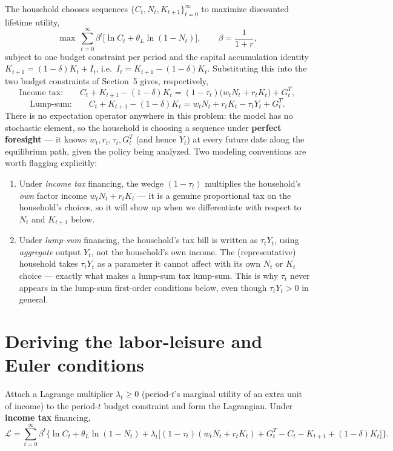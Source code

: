 \documentclass[11pt]{article}
\newcommand{\eq}[1]{\begin{equation}#1\end{equation}}
\begin{document}
The household chooses sequences $\{C_t,N_t,K_{t+1}\}_{t=0}^{\infty}$ to
maximize discounted lifetime utility,
\eq{ \max\ \sum_{t=0}^{\infty}\beta^t\Big[\ln C_t + \theta_L\ln(1-N_t)\Big], \qquad \beta=\frac{1}{1+r}, }
subject to one budget constraint per period and the capital accumulation
identity $K_{t+1}=(1-\delta)K_t+I_t$, i.e.\ $I_t=K_{t+1}-(1-\delta)K_t$.
Substituting this into the two budget constraints of
Section~5 gives, respectively,
\eq{ \text{Income tax:}\qquad C_t + K_{t+1}-(1-\delta)K_t = (1-\tau_t)\big(w_tN_t+r_tK_t\big)+G^T_t, \label{app:bc-it} }
\eq{ \text{Lump-sum:}\qquad C_t + K_{t+1}-(1-\delta)K_t = w_tN_t+r_tK_t-\tau_tY_t+G^T_t. \label{app:bc-ls} }
There is no expectation operator anywhere in this problem: the model has
no stochastic element, so the household is choosing a sequence under
\textbf{perfect foresight} --- it knows $w_t,r_t,\tau_t,G^T_t$ (and hence
$Y_t$) at every future date along the equilibrium path, given the policy
being analyzed. Two modeling conventions are worth flagging explicitly:
\begin{enumerate}[label=(\roman*)]
\item Under \emph{income tax} financing, the wedge $(1-\tau_t)$ multiplies
  the household's \emph{own} factor income $w_tN_t+r_tK_t$ --- it is a
  genuine proportional tax on the household's choices, so it will show up
  when we differentiate with respect to $N_t$ and $K_{t+1}$ below.
\item Under \emph{lump-sum} financing, the household's tax bill is written
  as $\tau_tY_t$, using \emph{aggregate} output $Y_t$, not the household's
  own income. The (representative) household takes $\tau_tY_t$ as a
  parameter it cannot affect with its own $N_t$ or $K_t$ choice --- exactly
  what makes a lump-sum tax lump-sum. This is why $\tau_t$ never appears
  in the lump-sum first-order conditions below, even though $\tau_tY_t>0$
  in general.
\end{enumerate}

\section{Deriving the labor-leisure and Euler conditions}
\label{app:focs}

Attach a Lagrange multiplier $\lambda_t\ge 0$ (period-$t$'s marginal
utility of an extra unit of income) to the period-$t$ budget constraint and
form the Lagrangian. Under \textbf{income tax} financing,
\eq{
\mathcal{L} = \sum_{t=0}^{\infty}\beta^t\Big\{
  \ln C_t + \theta_L\ln(1-N_t)
  + \lambda_t\Big[(1-\tau_t)(w_tN_t+r_tK_t)+G^T_t-C_t-K_{t+1}+(1-\delta)K_t\Big]
\Big\}.
}
\end{document}
